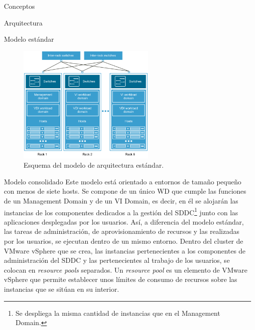 \begin{section}{Conceptos}
\begin{subsection}{Arquitectura}
\begin{subsubsection}{Modelo estándar}
\begin{figure}[h!]
  \centering
  \includegraphics[width=0.6\textwidth]{imaxes/conceptosPrevios/arquitect_standarCF.png}
  \caption{Esquema del modelo de arquitectura estándar.}
  \label{fig:modelostandard}
\end{figure}

\FloatBarrier
\end{subsubsection}
\begin{subsubsection}{Modelo consolidado}
Este modelo está orientado a entornos de tamaño pequeño con menos de siete hosts. Se compone de un único WD que cumple las funciones de un Management Domain y de un VI Domain, es decir, en él se alojarán las instancias de los componentes dedicados a la gestión del SDDC\footnote{Se despliega la misma cantidad de instancias que en el Management Domain.} junto con las aplicaciones desplegadas por los usuarios. Así, a diferencia del modelo estándar, las tareas de administración, de aprovisionamiento de recursos y las realizadas por los usuarios, se ejecutan dentro de un mismo entorno. 
Dentro del cluster de VMware vSphere que se crea, las instancias pertenecientes a los componentes de administración del SDDC y las pertenecientes al trabajo de los usuarios, se colocan en \textit{resource pools} separados. Un \textit{resource pool} es un elemento de VMware vSphere que permite establecer unos límites de consumo de recursos sobre las instancias que se sitúan en su interior\cite{resourcePool}.


\end{subsubsection}
\end{subsection}
\end{section}
